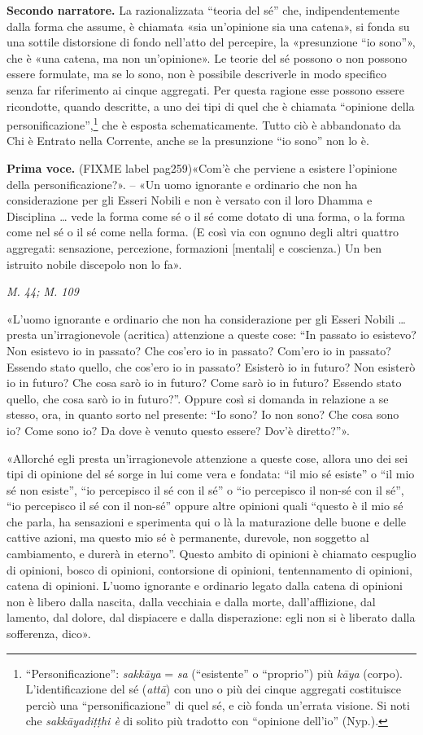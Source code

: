 \textbf{Secondo narratore.} La razionalizzata “teoria del sé” che,
indipendentemente dalla forma che assume, è chiamata «sia un’opinione
sia una catena», si fonda su una sottile distorsione di fondo nell’atto
del percepire, la «presunzione “io sono”», che è «una catena, ma non
un’opinione». Le teorie del sé possono o non possono essere formulate,
ma se lo sono, non è possibile descriverle in modo specifico senza far
riferimento ai cinque aggregati. Per questa ragione esse possono essere
ricondotte, quando descritte, a uno dei tipi di quel che è chiamata
“opinione della personificazione”,\footnote{“Personificazione”: \emph{sakkāya} = \emph{sa} (“esistente” o “proprio”) più \emph{kāya} (corpo). L’identificazione del sé (\emph{attā}) con uno o più dei cinque aggregati costituisce perciò una “personificazione” di quel sé, e ciò fonda un’errata visione. Si noti che \emph{sakkāyadiṭṭhi è} di solito più tradotto con “opinione dell’io” (Nyp.).} che è esposta
schematicamente. Tutto ciò è abbandonato da Chi è Entrato nella
Corrente, anche se la presunzione “io sono” non lo è.


\textbf{Prima voce.} (FIXME label pag259)«Com’è che perviene a esistere l’opinione della
personificazione?». – «Un uomo ignorante e ordinario che non ha
considerazione per gli Esseri Nobili e non è versato con il loro Dhamma
e Disciplina … vede la forma come sé o il sé come dotato di una forma, o
la forma come nel sé o il sé come nella forma. (E così via con ognuno
degli altri quattro aggregati: sensazione, percezione, formazioni
[mentali] e coscienza.) Un ben istruito nobile discepolo non lo fa».


\emph{M. 44; M. 109}


«L’uomo ignorante e ordinario che non ha considerazione per gli Esseri
Nobili … presta un’irragionevole (acritica) attenzione a queste cose:
“In passato io esistevo? Non esistevo io in passato? Che cos’ero io in
passato? Com’ero io in passato? Essendo stato quello, che cos’ero io in
passato? Esisterò io in futuro? Non esisterò io in futuro? Che cosa sarò
io in futuro? Come sarò io in futuro? Essendo stato quello, che cosa
sarò io in futuro?”. Oppure così si domanda in relazione a se stesso,
ora, in quanto sorto nel presente: “Io sono? Io non sono? Che cosa sono
io? Come sono io? Da dove è venuto questo essere? Dov’è diretto?”».


«Allorché egli presta un’irragionevole attenzione a queste cose, allora
uno dei sei tipi di opinione del sé sorge in lui come vera e fondata:
“il mio sé esiste” o “il mio sé non esiste”, “io percepisco il sé con il
sé” o “io percepisco il non-sé con il sé”, “io percepisco il sé con il
non-sé” oppure altre opinioni quali “questo è il mio sé che parla, ha
sensazioni e sperimenta qui o là la maturazione delle buone e delle
cattive azioni, ma questo mio sé è permanente, durevole, non soggetto al
cambiamento, e durerà in eterno”. Questo ambito di opinioni è chiamato
cespuglio di opinioni, bosco di opinioni, contorsione di opinioni,
tentennamento di opinioni, catena di opinioni. L’uomo ignorante e
ordinario legato dalla catena di opinioni non è libero dalla nascita,
dalla vecchiaia e dalla morte, dall’afflizione, dal lamento, dal dolore,
dal dispiacere e dalla disperazione: egli non si è liberato dalla
sofferenza, dico».



